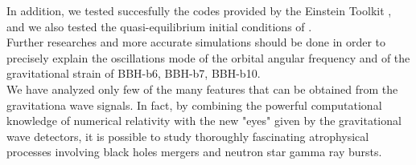 In addition, we tested succesfully the codes provided by the Einstein Toolkit \cite{EinsteinToolkit:web}, and we also tested the quasi-equilibrium initial conditions of \cite{tichy_quasi-equilibrium_2004}.\\
Further researches and more accurate simulations should be done in order to precisely explain the oscillations mode of the orbital angular frequency and of the gravitational strain of BBH-b6, BBH-b7, BBH-b10.\\
We have analyzed only few of the many features that can be obtained from the gravitationa wave signals.
In fact, by combining the powerful computational knowledge of numerical relativity with the new "eyes" given by the gravitational wave detectors, it is possible to study thoroughly fascinating atrophysical processes involving black holes mergers and neutron star gamma ray bursts.




